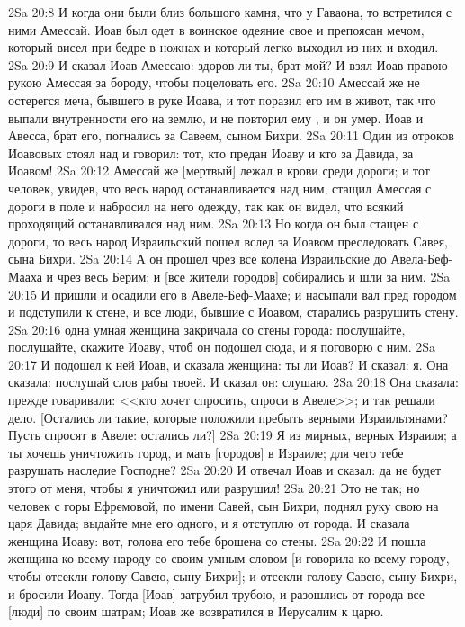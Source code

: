 \vs 2Sa 20:8 И когда они были близ большого камня, что у Гаваона, то встретился с ними Амессай. Иоав был одет в воинское одеяние свое и препоясан мечом, который висел при бедре в ножнах и который легко выходил из них и входил.
\vs 2Sa 20:9 И сказал Иоав Амессаю: здоров ли ты, брат мой? И взял Иоав правою рукою Амессая за бороду, чтобы поцеловать его.
\vs 2Sa 20:10 Амессай же не остерегся меча, бывшего в руке Иоава, и тот поразил его им в живот, так что выпали внутренности его на землю, и не повторил ему , и он умер. Иоав и Авесса, брат его, погнались за Савеем, сыном Бихри.
\vs 2Sa 20:11 Один из отроков Иоавовых стоял над  и говорил: тот, кто предан Иоаву и кто за Давида,  за Иоавом!
\vs 2Sa 20:12 Амессай же [мертвый] лежал в крови среди дороги; и тот человек, увидев, что весь народ останавливается над ним, стащил Амессая с дороги в поле и набросил на него одежду, так как он видел, что всякий проходящий останавливался над ним.
\vs 2Sa 20:13 Но когда он был стащен с дороги, то весь народ Израильский пошел вслед за Иоавом преследовать Савея, сына Бихри.
\vs 2Sa 20:14 А он прошел чрез все колена Израильские до Авела-Беф-Мааха и чрез весь Берим; и [все жители городов] собирались и шли за ним.
\vs 2Sa 20:15 И пришли и осадили его в Авеле-Беф-Маахе; и насыпали вал пред городом и подступили к стене, и все люди, бывшие с Иоавом, старались разрушить стену.
\vs 2Sa 20:16  одна умная женщина закричала со стены города: послушайте, послушайте, скажите Иоаву, чтоб он подошел сюда, и я поговорю с ним.
\vs 2Sa 20:17 И подошел к ней Иоав, и сказала женщина: ты ли Иоав? И сказал: я. Она сказала: послушай слов рабы твоей. И сказал он: слушаю.
\vs 2Sa 20:18 Она сказала: прежде говаривали: <<кто хочет спросить, спроси в Авеле>>; и так решали дело. [Остались ли такие, которые положили пребыть верными Израильтянами? Пусть спросят в Авеле: остались ли?]
\vs 2Sa 20:19 Я из мирных, верных  Израиля; а ты хочешь уничтожить город, и  мать [городов] в Израиле; для чего тебе разрушать наследие Господне?
\vs 2Sa 20:20 И отвечал Иоав и сказал: да не будет этого от меня, чтобы я уничтожил или разрушил!
\vs 2Sa 20:21 Это не так; но человек с горы Ефремовой, по имени Савей, сын Бихри, поднял руку свою на царя Давида; выдайте мне его одного, и я отступлю от города. И сказала женщина Иоаву: вот, голова его  тебе брошена со стены.
\vs 2Sa 20:22 И пошла женщина ко всему народу со своим умным словом [и говорила ко всему городу, чтобы отсекли голову Савею, сыну Бихри]; и отсекли голову Савею, сыну Бихри, и бросили Иоаву. Тогда [Иоав] затрубил трубою, и разошлись от города все [люди] по своим шатрам; Иоав же возвратился в Иерусалим к царю.
